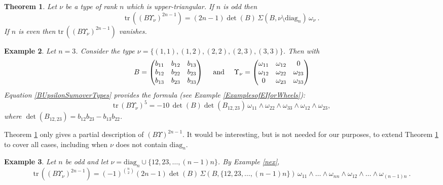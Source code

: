 \documentclass[10pt]{amsart}
\newcommand{\tr}{\mathrm{tr}\,}
\newcommand{\diag}{\mathrm{diag}}
\theoremstyle{plain}
\newtheorem{thm}{Theorem}
\newtheorem{ex}[thm]{Example}
\newcommand{\0}{\color{blue}{\mathsf{0}}}
\begin{document}
\begin{thm} \label{antisymthm}  Let $\nu$ be a type of rank $n$ which is upper-triangular.
If $n$ is odd then
\[  \tr \left( (B \Upsilon_{\nu})^{2n-1}\right) =(2n-1) \det(B) \,  \Sigma(B,{\nu}\setminus\diag_n) \, \omega_{\nu} \ . \]
If $n$ is even then $\tr \left( (B \Upsilon_{\nu})^{2n-1}\right)$ vanishes.    
\end{thm}

\begin{ex} Let $n=3$. Consider the type $\nu=\{(1,1),(1,2),(2,2), (2,3),(3,3)\}$. Then with 
\[  B =  \begin{pmatrix} 
b_{11} & b_{12}  & b_{13}  \\
b_{12} & b_{22} & b_{23}  \\ 
 b_{13} & b_{23} & b_{33}
\end{pmatrix}  \quad  \hbox{ and } \quad  \Upsilon_{\nu} = \begin{pmatrix} 
\omega_{11} & \omega_{12}  & 0  \\
\omega_{12} & \omega_{22} & \omega_{23}  \\ 
 0 & \omega_{23} & \omega_{33}
\end{pmatrix} \]
 Equation \eqref{BUpsilonSumoverTypes} provides the formula (see Example \ref{ExamplesofEIforWheels}): 
\[ \tr (B\Upsilon_{\nu})^5 =   - 10 \, \det(B)  \det(B_{12,23})\,
 \omega_{11} \wedge \omega_{22} \wedge \omega_{33} \wedge \omega_{12} \wedge \omega_{23},\]
where $\det(B_{12,23})=b_{12} b_{23}  -  b_{13}b_{22}$.
\end{ex}
Theorem \ref{antisymthm} only gives a partial  description of $(B \Upsilon)^{2n-1}$.   It would be interesting, but is not needed for our purposes, to extend Theorem  \ref{antisymthm} to cover all cases, including when $\nu$ does not contain $\diag_n$. 


\begin{ex}\label{wheelex3}
Let $n$ be odd and  let $\nu = \diag_n \cup \{12,23,\ldots,(n-1)n\}$.
By Example \ref{nex},  
\begin{equation}\label{w3eq}
\tr \left( (B \Upsilon_{\nu})^{2n-1}\right)=(-1)^{\binom{n}2}(2n-1)\det  (B)  \,   \Sigma(B,\{12,23,\ldots,(n-1)n\}) \,
\omega_{11}\wedge\ldots\wedge\omega_{nn}\wedge\omega_{12}\wedge\ldots\wedge\omega_{(n-1)n}\ .
\end{equation}
\end{ex}
\end{document}
